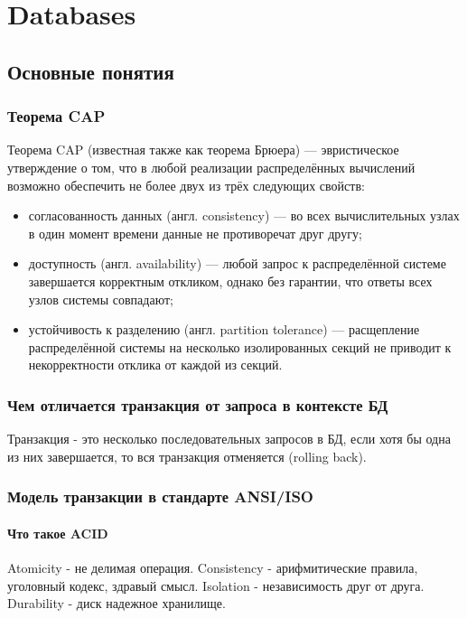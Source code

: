 \part{Databases}

\chapter{Основные понятия}

\section{Теорема CAP}

Теорема CAP (известная также как теорема Брюера) — эвристическое утверждение о том, что в любой реализации распределённых вычислений возможно обеспечить не более двух из трёх следующих свойств:
\begin{itemize}

\item согласованность данных (англ. consistency) — во всех вычислительных узлах в один момент времени данные не противоречат друг другу;
\item доступность (англ. availability) — любой запрос к распределённой системе завершается корректным откликом, однако без гарантии, что ответы всех узлов системы совпадают;
\item устойчивость к разделению (англ. partition tolerance) — расщепление распределённой системы на несколько изолированных секций не приводит к некорректности отклика от каждой из секций.

\end{itemize}

\section{Чем отличается транзакция от запроса в контексте БД}
Транзакция - это несколько последовательных запросов в БД, если хотя бы одна из них завершается, то вся транзакция отменяется (rolling back).

\section{Модель транзакции в стандарте ANSI/ISO}
\subsection{Что такое ACID}

Atomicity - не делимая операция.
Consistency - арифмитические правила, уголовный кодекс, здравый смысл.
Isolation - независимость друг от друга.
Durability - диск надежное хранилище.

